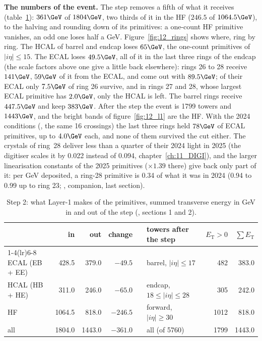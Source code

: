 \textbf{The numbers of the event.} The step removes a fifth of what it receives (table~\ref{tab:12_l1}): $361\GeV$
of $1804\GeV$, two thirds of it in the HF ($246.5$ of $1064.5\GeV$), to the halving and rounding down of its
primitives: a one-count HF primitive vanishes, an odd one loses half a GeV. Figure~\ref{fig:12_rings} shows where,
ring by ring. The HCAL of barrel and endcap loses $65\GeV$, the one-count primitives of $|i\eta|\leq15$. The ECAL
loses $49.5\GeV$, all of it in the last three rings of the endcap (the scale factors above one give a little back
elsewhere): rings 26 to 28 receive $141\GeV$, $59\GeV$ of it from the ECAL, and come out with $89.5\GeV$; of their ECAL
only $7.5\GeV$ of ring 26 survive, and in rings 27 and 28, whose largest ECAL primitive has $2.0\GeV$, only the HCAL
is left. The barrel rings receive $447.5\GeV$ and keep $383\GeV$. After the step the event is 1799 towers and
$1443\GeV$, and the bright bands of figure~\ref{fig:12_l1} are the HF. With the 2024 conditions (, the
same 16 crossings) the last three rings held $78\GeV$ of ECAL primitives, up to $4.0\GeV$ each, and none of them
survived the cut either. The crystals of ring~28 deliver less than a quarter of their 2024 light in 2025 (the
digitiser scales it by 0.022 instead of 0.094, chapter~\ref{ch:11_DIGI}), and the larger linearisation constants of
the 2025 primitives ($\times1.39$ there) give back only part of it: per GeV deposited, a ring-28 primitive is 0.34 of
what it was in 2024 (0.94 to 0.99 up to ring 23; , companion, last section).

\begin{table}[!htb]
\centering\small
\caption{Step 2: what Layer-1 makes of the primitives, summed transverse energy in GeV in and out of the step
(, sections 1 and 2).}
\label{tab:12_l1}
\begin{tabular}{l rrr c l rr}
\toprule
 & in & out & change & & towers after the step & $E_{\mathrm T}>0$ & $\sum E_{\mathrm T}$ \\
\cmidrule(lr){1-4}\cmidrule(lr){6-8}
ECAL (EB + EE) & 428.5 & 379.0 & $-49.5$ & & barrel, $|i\eta|\leq17$ & 482 & 383.0 \\
HCAL (HB + HE) & 311.0 & 246.0 & $-65.0$ & & endcap, $18\leq|i\eta|\leq28$ & 305 & 242.0 \\
HF & 1064.5 & 818.0 & $-246.5$ & & forward, $|i\eta|\geq30$ & 1012 & 818.0 \\
all & 1804.0 & 1443.0 & $-361.0$ & & all (of 5760) & 1799 & 1443.0 \\
\bottomrule
\end{tabular}
\end{table}

